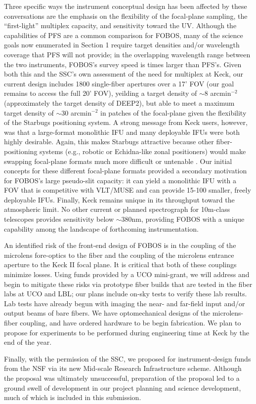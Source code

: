 Three specific ways the instrument conceptual design has been
affected by these conversations are the emphasis on the flexibility
of the focal-plane sampling, the ``first-light'' multiplex capacity,
and sensitivity toward the UV. Although the capabilities of PFS are a
common comparison for FOBOS, many of the science goals now enumerated
in Section 1 require target densities and/or wavelength coverage that
PFS will not provide; in the overlapping wavelength range between the
two instruments, FOBOS's survey speed is  times larger
than PFS's. Given both this and the SSC's own assessment of the need
for multiplex at Keck, our current design includes 1800 single-fiber
apertures over a 17' FOV (our goal remains to access the full 20'
FOV), yeilding a target density of $\sim$8 arcmin$^{-2}$
(approximately the target density of DEEP2), but able to meet a
maximum target density of $\sim$30 arcmin$^{-2}$ in patches of the
focal-plane given the flexibility of the Starbugs positioning system.
A strong message from Keck users, however, was that a large-format
monolithic IFU and many deployable IFUs were both highly desirable.
Again, this makes Starbugs attractive because other fiber-positioning
systems (e.g., robotic or Echidna-like zonal positioners) would make
swapping focal-plane formats much more difficult or untenable
. Our initial concepts for these different
focal-plane formats provided a secondary motivation for FOBOS's large
pseudo-slit capacity: it can yield a monolithic IFU with a FOV that
is competitive with VLT/MUSE and can provide 15-100 smaller, freely
deployable IFUs. Finally, Keck remains unique in its throughput
toward the atmospheric limit. No other current or planned
 spectrograph for 10m-class telescopes
provides sensitivity below $\sim$380nm, providing FOBOS with a unique
capability among the landscape of forthcoming instrumentation.

An identified risk of the front-end design of FOBOS is in the
coupling of the microlens fore-optics to the fiber and the coupling
of the microlens entrance aperture to the Keck II focal plane. It is
critical that both of these couplings minimize losses. Using funds
provided by a UCO mini-grant, we will address and begin to mitigate
these risks via prototype fiber builds that are tested in the fiber
labs at UCO and LBL; our plans include on-sky tests to verify these
lab results. Lab tests have already begun with imaging the near- and
far-field input and/or output beams of bare fibers. We have
optomechanical designs of the microlens-fiber coupling, and have
ordered hardware to be begin fabrication. We plan to propose for
experiments to be performed during engineering time at Keck by the
end of the year.

Finally, with the permission of the SSC, we proposed for
instrument-design funds from the NSF via its new Mid-scale Research
Infrastructure scheme. Although the proposal was ultimately
unsuccessful, preparation of the proposal led to a ground swell of
development in our project planning and science development, much of
which is included in this submission.
